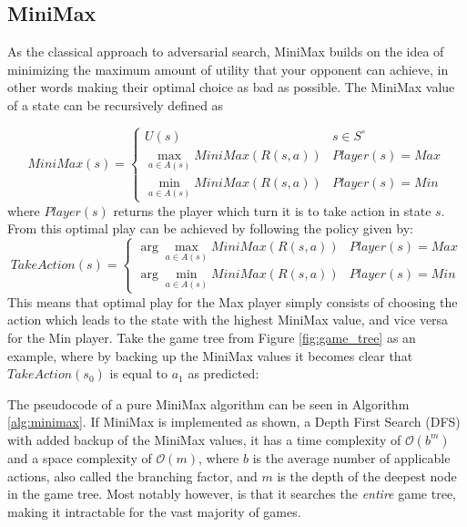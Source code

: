 \subsection{MiniMax}

As the classical approach to adversarial search, MiniMax builds on the idea of minimizing the maximum amount of utility that your opponent can achieve, in other words making their optimal choice as bad as possible. The MiniMax value of a state can be recursively defined as

\begin{equation}
    MiniMax(s) = \begin{cases}
        U(s) & s \in S^\circ \\
        \max_{a \in A(s)} MiniMax(R(s, a)) & Player(s) = Max \\
        \min_{a \in A(s)} MiniMax(R(s, a)) & Player(s) = Min
    \end{cases}
    \label{eq:MiniMax}
\end{equation}
where $Player(s)$ returns the player which turn it is to take action in state $s$. From this optimal play can be achieved by following the policy given by:
\begin{equation}
    TakeAction(s) = \begin{cases}
        \arg\max_{a \in A(s)} MiniMax(R(s, a)) & Player(s) = Max \\
        \arg\min_{a \in A(s)} MiniMax(R(s, a)) & Player(s) = Min
    \end{cases}
    \label{eq:MiniMax_policy}
\end{equation}
This means that optimal play for the Max player simply consists of choosing the action which leads to the state with the highest MiniMax value, and vice versa for the Min player. Take the game tree from Figure \ref{fig:game_tree} as an example, where by backing up the MiniMax values it becomes clear that $TakeAction(s_0)$ is equal to $a_1$ as predicted:





The pseudocode of a pure MiniMax algorithm can be seen in Algorithm \ref{alg:minimax}. If MiniMax is implemented as shown, a Depth First Search (DFS) with added backup of the MiniMax values, it has a time complexity of $\mathcal{O}(b^m)$ and a space complexity of $\mathcal{O}(m)$, where $b$ is the average number of applicable actions, also called the branching factor, and $m$ is the depth of the deepest node in the game tree. Most notably however, is that it searches the \textit{entire} game tree, making it intractable for the vast majority of games.

